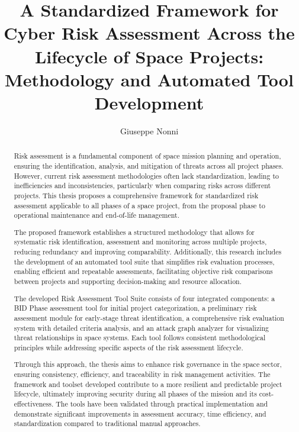 \documentclass[binding=0.6cm]{sapthesis}
\title{A Standardized Framework for Cyber Risk Assessment Across the Lifecycle of Space Projects: Methodology and Automated Tool Development}
\author{Giuseppe Nonni}
\begin{document}
\frontmatter
\maketitle

\dedication{Dedicated to\\
all the space explorers\\
who dare to reach for the stars}

\begin{abstract}
Risk assessment is a fundamental component of space mission planning and operation, ensuring the identification, analysis, and mitigation of threats across all project phases. However, current risk assessment methodologies often lack standardization, leading to inefficiencies and inconsistencies, particularly when comparing risks across different projects. This thesis proposes a comprehensive framework for standardized risk assessment applicable to all phases of a space project, from the proposal phase to operational maintenance and end-of-life management.

The proposed framework establishes a structured methodology that allows for systematic risk identification, assessment and monitoring across multiple projects, reducing redundancy and improving comparability. Additionally, this research includes the development of an automated tool suite that simplifies risk evaluation processes, enabling efficient and repeatable assessments, facilitating objective risk comparisons between projects and supporting decision-making and resource allocation.

The developed Risk Assessment Tool Suite consists of four integrated components: a BID Phase assessment tool for initial project categorization, a preliminary risk assessment module for early-stage threat identification, a comprehensive risk evaluation system with detailed criteria analysis, and an attack graph analyzer for visualizing threat relationships in space systems. Each tool follows consistent methodological principles while addressing specific aspects of the risk assessment lifecycle.

Through this approach, the thesis aims to enhance risk governance in the space sector, ensuring consistency, efficiency, and traceability in risk management activities. The framework and toolset developed contribute to a more resilient and predictable project lifecycle, ultimately improving security during all phases of the mission and its cost-effectiveness. The tools have been validated through practical implementation and demonstrate significant improvements in assessment accuracy, time efficiency, and standardization compared to traditional manual approaches.
\end{abstract}
\end{document}
